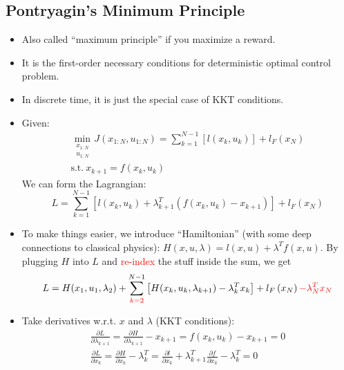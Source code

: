 \subsection{Pontryagin's Minimum Principle}

\begin{itemize}
    \item Also called ``maximum principle'' if you maximize a reward.
    \item It is the first-order necessary conditions for deterministic optimal control problem.
    \item In discrete time, it is just the special case of KKT conditions.
    \item Given:
    \begin{equation}
        \begin{aligned}
            \min _{\substack{x_{1:N}\\u_{1:N}}}J\left( x_{1:N},u_{1:N} \right) =\sum_{k=1}^{N-1}{\left[l\left( x_k,u_k \right)\right]}+l_F\left( x_N \right)\\
            \text{s.t.}\ x_{k+1}=f\left( x_k,u_k \right)
        \end{aligned}
    \end{equation}
    We can form the Lagrangian:
    \begin{equation}
        L = \sum_{k=1}^{N-1}{\left[l\left( x_k,u_k \right) + \lambda_{k+1}^T\left(f(x_k,u_k)-x_{k+1}\right)\right]}+l_F\left( x_N \right)
    \end{equation}
    \item To make things easier, we introduce ``Hamiltonian'' (with some deep connections to classical physics): $H(x,u,\lambda)=l(x,u)+\lambda^Tf(x,u)$. By plugging $H$ into $L$ and \textcolor{red}{re-index} the stuff inside the sum, we get
    \begin{equation}
        L = H(x_1,u_1,\lambda_2) + \sum_{\textcolor{red}{k=2}}^{N-1}{\left[H(x_k,u_k,\lambda_{k+1}) - \lambda_{k}^Tx_k\right]}+l_F\left( x_N \right) \textcolor{red}{- \lambda_N^Tx_N}
    \end{equation}
    \item Take derivatives w.r.t. $x$ and $\lambda$ (KKT conditions):
    \begin{equation}
        \begin{aligned}
            \frac{\partial L}{\partial \lambda _{k+1}}=\frac{\partial H}{\partial \lambda _{k+1}}-x_{k+1}=f\left( x_k,u_k \right) -x_{k+1}=0\\
            \frac{\partial L}{\partial x_k}=\frac{\partial H}{\partial x_k}-\lambda _{k}^{T}=\frac{\partial l}{\partial x_k}+\lambda _{k+1}^{T}\frac{\partial f}{\partial x_k}-\lambda _{k}^{T}=0\\

\end{aligned}
\end{equation}
\end{itemize}
